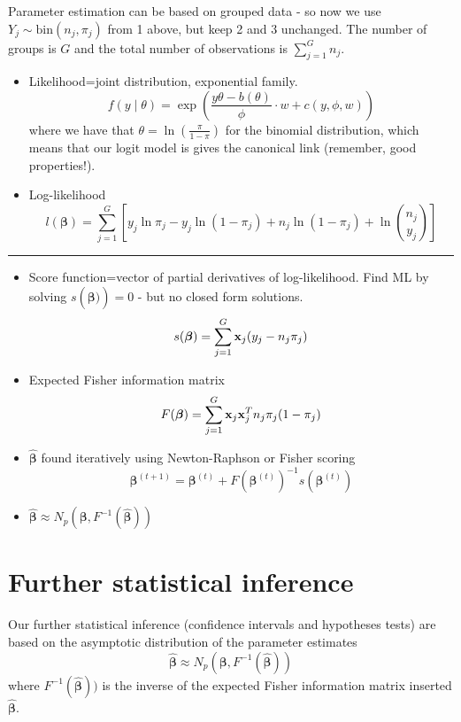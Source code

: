 \documentclass[
]{article}
\begin{document}
Parameter estimation can be based on grouped data - so now we use
\(Y_j \sim \text{bin}(n_j,\pi_j)\) from 1 above, but keep 2 and 3
unchanged. The number of groups is \(G\) and the total number of
observations is \(\sum_{j=1}^G n_j\).

\begin{itemize}
\item
  Likelihood=joint distribution, exponential family.
  \[ f(y\mid \theta)=\exp \left( \frac{y \theta-b(\theta)}{\phi}\cdot w + c(y, \phi, w) \right) \]
  where we have that \(\theta=\ln(\frac{\pi}{1-\pi})\) for the binomial
  distribution, which means that our logit model is gives the canonical
  link (remember, good properties!).
\item
  Log-likelihood
  \[l(\boldsymbol{\beta})=\sum_{j=1}^G[y_j \ln \pi_j-y_j\ln(1-\pi_j)+n_j\ln(1-\pi_j)+ \ln {n_j \choose y_j}]\]
\end{itemize}

\begin{center}\rule{0.5\linewidth}{0.5pt}\end{center}

\begin{itemize}
\item
  Score function=vector of partial derivatives of log-likelihood. Find
  ML by solving \(s(\hat{\boldsymbol{\beta})})=0\) - but no closed form
  solutions.
  \[s(\boldsymbol{\beta})=\sum_{j=1}^G {\bf x}_j (y_j-n_j\pi_j)\]
\item
  Expected Fisher information matrix
  \[F(\boldsymbol{\beta})=\sum_{j=1}^G {\bf x}_j {\bf x}_j^T n_j \pi_j (1-\pi_j)\]
\item
  \(\hat{\boldsymbol{\beta}}\) found iteratively using Newton-Raphson or
  Fisher scoring
  \[\boldsymbol{\beta}^{(t+1)}=\boldsymbol{\beta}^{(t)} + F(\boldsymbol{\beta}^{(t)})^{-1} s(\boldsymbol{\beta}^{(t)})\]
\item
  \(\hat{\boldsymbol{\beta}} \approx N_p(\boldsymbol{\beta},F^{-1}(\hat{\boldsymbol{\beta}}))\)
\end{itemize}

\hypertarget{further-statistical-inference}{%
\section{Further statistical
inference}\label{further-statistical-inference}}

Our further statistical inference (confidence intervals and hypotheses
tests) are based on the asymptotic distribution of the parameter
estimates
\[\hat{\boldsymbol{\beta}} \approx N_p(\boldsymbol{\beta},F^{-1}(\hat{\boldsymbol{\beta}}))\]
where \(F^{-1}(\hat{\boldsymbol{\beta}}))\) is the inverse of the
expected Fisher information matrix inserted
\(\hat{\boldsymbol{\beta}}\).
\end{document}
